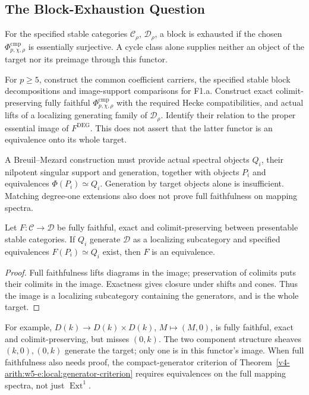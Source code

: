 \subsection{The Block-Exhaustion Question}

\begin{definition}
\label{v4-arith:deg-f1a:def:block-exhaustion}
For the specified stable categories \(\mathcal C_\rho\),
\(\mathcal D_\rho\), a block is exhausted if the chosen
\(\Phi^{\mathrm{cmp}}_{p,\chi,\rho}\) is essentially surjective.
A cycle class alone supplies neither an object of the target nor
its preimage through this functor.
\end{definition}
\begin{conjecture}
\label{v4-arith:deg-f1a:conj:block-exhaustion}
For \(p\ge5\), construct the common coefficient carriers, the
specified stable block decompositions and image-support comparisons
for F1.a. Construct exact colimit-preserving fully faithful
\(\Phi^{\mathrm{cmp}}_{p,\chi,\rho}\) with the required Hecke
compatibilities, and actual lifts of a localizing generating family
of \(\mathcal D_\rho\). Identify their relation to the proper
essential image of \(F^{\mathrm{DEG}}\). This does not assert that
the latter functor is an equivalence onto its whole target.
\end{conjecture}
\begin{remark}
\label{v4-arith:deg-f1a:rem:how-to-prove-block-exhaustion}
A Breuil--Mezard construction must provide actual spectral objects
\(Q_i\), their nilpotent singular support and generation, together
with objects \(P_i\) and equivalences \(\Phi(P_i)\simeq Q_i\).
Generation by target objects alone is insufficient. Matching degree-one
extensions also does not prove full faithfulness on mapping spectra.
\end{remark}
\begin{proposition}
\label{v4-arith:deg-f1a:prop:lifted-generators}
Let \(F:\mathcal C\to\mathcal D\) be fully faithful, exact and
colimit-preserving between presentable stable categories. If
\(Q_i\) generate \(\mathcal D\) as a localizing subcategory and
specified equivalences \(F(P_i)\simeq Q_i\) exist, then \(F\)
is an equivalence.
\end{proposition}
\begin{proof}
Full faithfulness lifts diagrams in the image; preservation of
colimits puts their colimits in the image. Exactness gives closure
under shifts and cones. Thus the image is a localizing subcategory
containing the generators, and is the whole target.
\end{proof}
For example, \(D(k)\to D(k)\times D(k)\), \(M\mapsto(M,0)\),
is fully faithful, exact and colimit-preserving, but misses
\((0,k)\). The two component structure sheaves \((k,0),(0,k)\)
generate the target; only one is in this functor's image.
When full faithfulness also needs proof, the compact-generator
criterion of Theorem~\ref{v4-arith:w5-e:local:generator-criterion}
requires equivalences on the full mapping spectra, not just
\(\operatorname{Ext}^1\).

